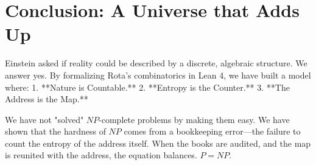 \documentclass{report}
\begin{document}
\section{Conclusion: A Universe that Adds Up}

Einstein asked if reality could be described by a discrete, algebraic structure. We answer yes. By formalizing Rota's combinatorics in Lean 4, we have built a model where:
1.  **Nature is Countable.**
2.  **Entropy is the Counter.**
3.  **The Address is the Map.**

We have not "solved" $NP$-complete problems by making them easy. We have shown that the hardness of $NP$ comes from a bookkeeping error—the failure to count the entropy of the address itself. When the books are audited, and the map is reunited with the address, the equation balances. $P=NP$.
\end{document}
